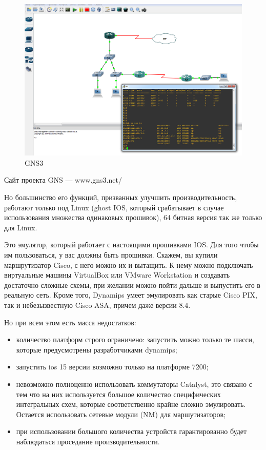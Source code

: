 \documentclass[a4paper,14pt]{extreport}
\begin{document}
	\begin{figure}[h!]
	\centering
	\includegraphics[width=0.9\linewidth]{pic/gns3}
	\caption{GNS3}
	\label{fig:gns3}
	\end{figure}

	Сайт проекта GNS — www.gns3.net/
	
	Но большинство его функций, призванных улучшить производительность, работают только под Linux (ghost IOS, который срабатывает в случае использования множества одинаковых прошивок), 64 битная версия так же только для Linux.
	
	Это эмулятор, который работает с настоящими прошивками IOS. Для того чтобы им пользоваться, у вас должны быть прошивки. Скажем, вы купили маршрутизатор Cisco, с него можно их и вытащить.
	К нему можно подключать виртуальные машины VirtualBox или VMware Workstation и создавать достаточно сложные схемы, при желании можно пойти дальше и выпустить его в реальную сеть.
	Кроме того, Dynamips умеет эмулировать как старые Cisco PIX, так и небезызвестную Cisco ASA, причем даже версии 8.4.
	
	Но при всем этом есть масса недостатков:
	
	\begin{itemize}
		\item количество платформ строго ограничено: запустить можно только те шасси, которые предусмотрены разработчиками dynamips;
	
		\item запустить ios 15 версии возможно только на платформе 7200;
	
		\item невозможно полноценно использовать коммутаторы Catalyst, это связано с тем что на них используется большое количество специфических интегральных схем, которые соответственно крайне сложно эмулировать. Остается использовать сетевые модули (NM) для маршутизаторов;
	
		\item при использовании большого количества устройств гарантированно будет наблюдаться проседание производительности.
	\end{itemize}
	
\end{document}
